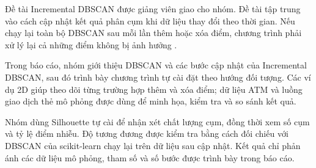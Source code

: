 Đề tài Incremental DBSCAN được giảng viên giao cho nhóm. Đề tài tập trung vào cách cập nhật kết quả phân cụm khi dữ liệu thay đổi theo thời gian. Nếu chạy lại toàn bộ DBSCAN sau mỗi lần thêm hoặc xóa điểm, chương trình phải xử lý lại cả những điểm không bị ảnh hưởng \parencite{ester1998incrementaldbscan}.

Trong báo cáo, nhóm giới thiệu DBSCAN và các bước cập nhật của Incremental DBSCAN, sau đó trình bày chương trình tự cài đặt theo hướng đối tượng. Các ví dụ 2D giúp theo dõi từng trường hợp thêm và xóa điểm; dữ liệu ATM và luồng giao dịch thẻ mô phỏng được dùng để minh họa, kiểm tra và so sánh kết quả.

Nhóm dùng Silhouette tự cài để nhận xét chất lượng cụm, đồng thời xem số cụm và tỷ lệ điểm nhiễu. Độ tương đương được kiểm tra bằng cách đối chiếu với DBSCAN của scikit-learn chạy lại trên dữ liệu sau cập nhật. Kết quả chỉ phản ánh các dữ liệu mô phỏng, tham số và số bước được trình bày trong báo cáo.
